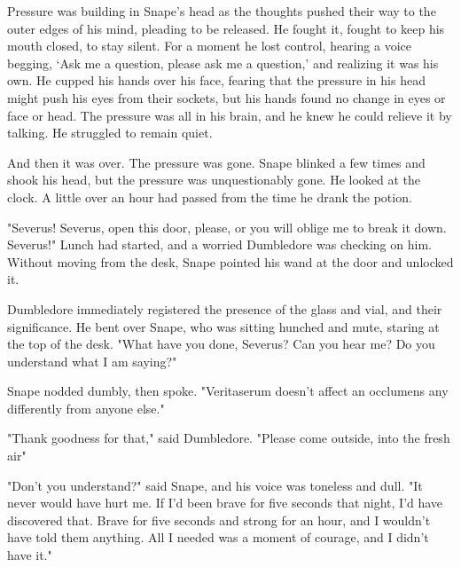 Pressure was building in Snape's head as the thoughts pushed their way to the outer edges of his mind, pleading to be released. He fought it, fought to keep his mouth closed, to stay silent. For a moment he lost control, hearing a voice begging, `Ask me a question, please ask me a question,' and realizing it was his own. He cupped his hands over his face, fearing that the pressure in his head might push his eyes from their sockets, but his hands found no change in eyes or face or head. The pressure was all in his brain, and he knew he could relieve it by talking. He struggled to remain quiet.

And then it was over. The pressure was gone. Snape blinked a few times and shook his head, but the pressure was unquestionably gone. He looked at the clock. A little over an hour had passed from the time he drank the potion.

"Severus! Severus, open this door, please, or you will oblige me to break it down. Severus!" Lunch had started, and a worried Dumbledore was checking on him. Without moving from the desk, Snape pointed his wand at the door and unlocked it.

Dumbledore immediately registered the presence of the glass and vial, and their significance. He bent over Snape, who was sitting hunched and mute, staring at the top of the desk. "What have you done, Severus? Can you hear me? Do you understand what I am saying?"

Snape nodded dumbly, then spoke. "Veritaserum doesn't affect an occlumens any differently from anyone else."

"Thank goodness for that," said Dumbledore. "Please come outside, into the fresh air{\el}"

"Don't you understand?" said Snape, and his voice was toneless and dull. "It never would have hurt me. If I'd been brave for five seconds that night, I'd have discovered that. Brave for five seconds and strong for an hour, and I wouldn't have told them anything. All I needed was a moment of courage, and I didn't have it."



